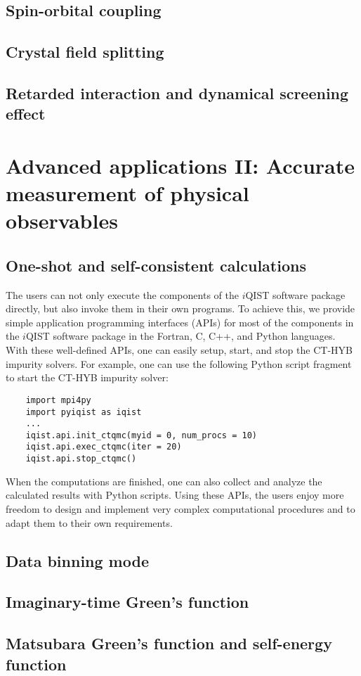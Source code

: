 \subsection{Spin-orbital coupling}
\subsection{Crystal field splitting}
\subsection{Retarded interaction and dynamical screening effect}

\section{Advanced applications II: Accurate measurement of physical observables}
\subsection{One-shot and self-consistent calculations}
The users can not only execute the components of the $i$QIST software package directly, but also invoke them in their own programs. To achieve this, we provide simple application programming interfaces (APIs) for most of the components in the $i$QIST software package in the Fortran, C, C++, and Python languages. With these well-defined APIs, one can easily setup, start, and stop the CT-HYB impurity solvers. For example, one can use the following Python script fragment to start the CT-HYB impurity solver:
\begin{verbatim}
    import mpi4py
    import pyiqist as iqist
    ...
    iqist.api.init_ctqmc(myid = 0, num_procs = 10)
    iqist.api.exec_ctqmc(iter = 20)
    iqist.api.stop_ctqmc()
\end{verbatim}
When the computations are finished, one can also collect and analyze the calculated results with Python scripts. Using these APIs, the users enjoy more freedom to design and implement very complex computational procedures and to adapt them to their own requirements.
\subsection{Data binning mode}
\subsection{Imaginary-time Green's function}
\subsection{Matsubara Green's function and self-energy function}
